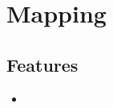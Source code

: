 \section{Mapping}
\label{module:Mapping}
\AvailableInJavaAndCsharp{\TODO}
\subsection{Features}
\begin{itemize}
	\item \TODO
\end{itemize}